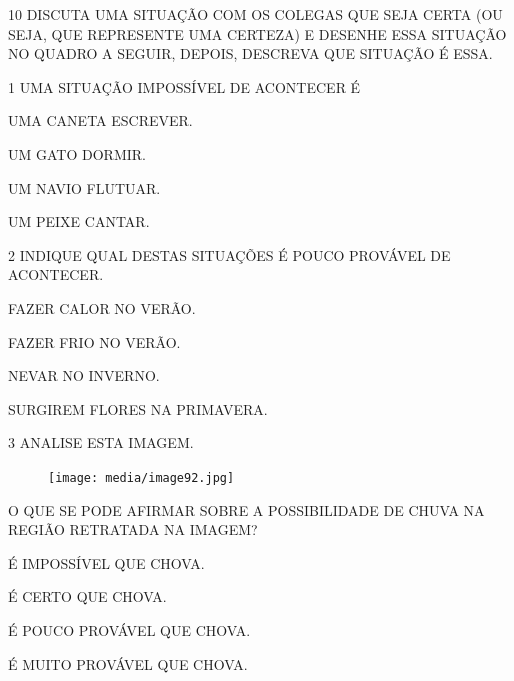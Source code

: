 \num{10} DISCUTA UMA SITUAÇÃO COM OS COLEGAS QUE SEJA CERTA (OU SEJA, QUE REPRESENTE UMA CERTEZA) E DESENHE ESSA SITUAÇÃO NO QUADRO A SEGUIR, DEPOIS, DESCREVA QUE SITUAÇÃO É ESSA.

\begin{mdframed}[linewidth=2pt,linecolor=salmao,roundcorner=10pt]
\vspace{19cm}
\end{mdframed}


\num{1} UMA SITUAÇÃO IMPOSSÍVEL DE ACONTECER É

\begin{escolha}
\item UMA CANETA ESCREVER.

\item UM GATO DORMIR.

\item UM NAVIO FLUTUAR.

\item UM PEIXE CANTAR.
\end{escolha}

\num{2} INDIQUE QUAL DESTAS SITUAÇÕES É POUCO PROVÁVEL DE ACONTECER.

\begin{escolha}
\item FAZER CALOR NO VERÃO.

\item FAZER FRIO NO VERÃO.

\item NEVAR NO INVERNO.

\item SURGIREM FLORES NA PRIMAVERA.
\end{escolha}

\num{3} ANALISE ESTA IMAGEM.

\begin{figure}[htpb!]
\centering
\texttt{[image: media/image92.jpg]}
\end{figure}

O QUE SE PODE AFIRMAR SOBRE A POSSIBILIDADE DE CHUVA NA REGIÃO RETRATADA NA IMAGEM?

\begin{escolha}
\item É IMPOSSÍVEL QUE CHOVA.

\item É CERTO QUE CHOVA.

\item É POUCO PROVÁVEL QUE CHOVA.

\item É MUITO PROVÁVEL QUE CHOVA.
\end{escolha}

